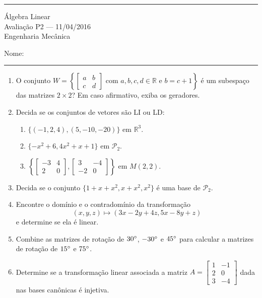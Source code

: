 \documentclass{article}
\begin{document}
\noindent{}\rule{\textwidth}{0.4pt}
\begin{center}
	\'{A}lgebra Linear\\
	Avalia\c{c}\~ao P2 --- 11/04/2016 \\
	Engenharia Mec\^anica \\
	\vspace{0.2cm}
\end{center}
Nome: \\
\noindent{}\rule{\textwidth}{0.4pt}

\begin{enumerate}
\item O conjunto
	$W = \left\{
		\left[\begin{array}{cc}
			a & b \\
			c & d
		\end{array}\right] \mbox{ com }
	a, b, c, d \in \mathbb{R} \mbox{ e } b = c + 1\right\}$
\'e um subespa\c{c}o das matrizes $2\times 2$? Em caso afirmativo, exiba os geradores.

\item Decida se os conjuntos de vetores s\~ao LI ou LD:
	\begin{enumerate}
		\item $\{(-1, 2, 4), (5, -10, -20)\}$ em $\mathbb{R}^3$.
		\item $\{-x^2+6, 4x^2+x+1\}$ em $\mathcal{P}_2$.
		\item $\left\{
			\left[\begin{array}{cc}
				-3 & 4 \\
				2 & 0
			\end{array}\right], 
			\left[\begin{array}{cc}
				3 & -4 \\
				-2 & 0
			\end{array}\right]\right\}$
		em $M(2, 2)$.
	\end{enumerate}

\item Decida se o conjunto $\{1+x+x^2, x+x^2, x^2\}$ \'e uma base de $\mathcal{P}_2$.

\item Encontre o dom\'inio e o contradom\'inio da transforma\c{c}\~ao	$$(x, y, z) \mapsto
	(3x-2y+4z, 5x-8y+z)$$ e determine se ela \'e linear.

\item Combine as matrizes de rota\c{c}\~ao de $30\degree$, $-30\degree$ e $45\degree$ para calcular a matrizes de
	rota\c{c}\~ao de $15\degree$ e $75\degree$.

\item Determine se a transforma\c{c}\~ao linear associada a matriz
	$A=\left[\begin{array}{cc}
			1 & -1 \\
			2 & 0 \\
			3 & -4
		\end{array}\right]$
	dada nas bases can\^onicas \'e injetiva.

\end{enumerate}
\end{document}
